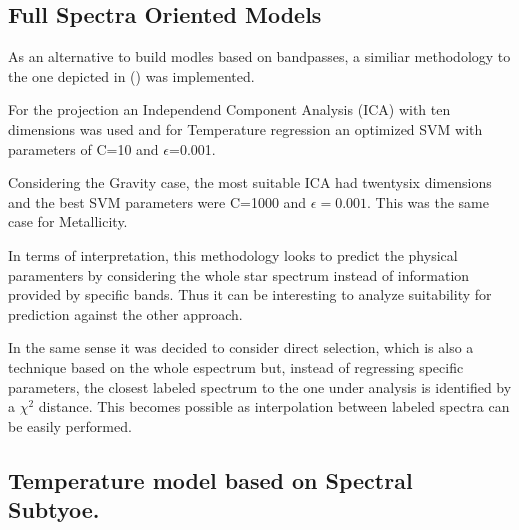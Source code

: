 \subsection{Full Spectra Oriented Models}
\label {ssub:GM_BPG}
{
As an alternative to build modles based on bandpasses, 
a similiar methodology to the one depicted in (\cite{2013A&A...550A.120S})
was implemented.

For the projection an Independend Component Analysis (ICA) with ten dimensions
was used and for Temperature regression an optimized SVM 
with parameters of C=10 and $\epsilon$=0.001.

Considering the Gravity case, the most suitable ICA had twentysix dimensions and the 
best SVM parameters were C=1000 and $\epsilon = 0.001 $. This was the same case
for Metallicity.

In terms of interpretation, this methodology looks to predict the physical paramenters
by considering the whole star spectrum instead of information provided 
by specific bands. Thus it can be interesting to analyze suitability 
for prediction against the other approach.

In the same sense it was decided to consider direct selection, which is
also a technique based on the whole espectrum but, instead of regressing
specific parameters, the closest labeled spectrum to the one 
under analysis is identified by a $\chi^2$ distance.
This becomes possible as interpolation between labeled spectra can be
easily performed.

}

\subsection{Temperature model based on Spectral Subtyoe.}
\label {ssub:TLSB}
{
}

